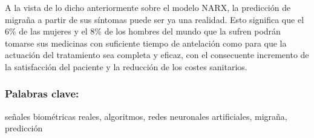 A la vista de lo dicho anteriormente sobre el modelo NARX, la predicción de migraña a partir de sus síntomas puede ser ya una realidad. Esto significa que el 6\% de las mujeres y el 8\% de los hombres del mundo que la sufren podrán tomarse sus medicinas con suficiente tiempo de antelación como para que la actuación del tratamiento sea completa y eficaz, con el consecuente incremento de la satisfacción del paciente y la reducción de los costes sanitarios.




\vspace*{0.5cm} 
 
\subsubsection*{Palabras  clave:}  señales biométricas reales, algoritmos, redes neuronales artificiales, migraña, predicción


